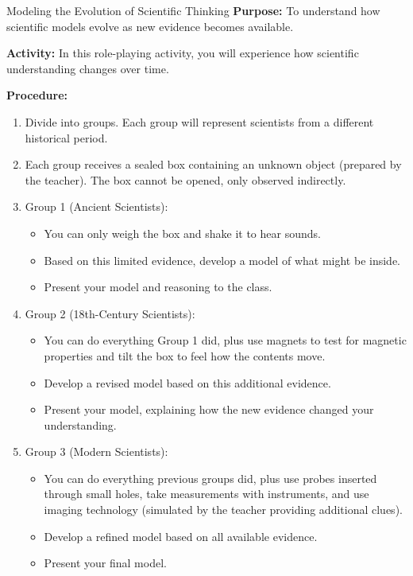 \begin{investigation}{Modeling the Evolution of Scientific Thinking}
\textbf{Purpose:} To understand how scientific models evolve as new evidence becomes available.

\textbf{Activity:} In this role-playing activity, you will experience how scientific understanding changes over time.

\textbf{Procedure:}
\begin{enumerate}
    \item Divide into groups. Each group will represent scientists from a different historical period.
    
    \item Each group receives a sealed box containing an unknown object (prepared by the teacher). The box cannot be opened, only observed indirectly.
    
    \item Group 1 (Ancient Scientists):
    \begin{itemize}
        \item You can only weigh the box and shake it to hear sounds.
        \item Based on this limited evidence, develop a model of what might be inside.
        \item Present your model and reasoning to the class.
    \end{itemize}
    
    \item Group 2 (18th-Century Scientists):
    \begin{itemize}
        \item You can do everything Group 1 did, plus use magnets to test for magnetic properties and tilt the box to feel how the contents move.
        \item Develop a revised model based on this additional evidence.
        \item Present your model, explaining how the new evidence changed your understanding.
    \end{itemize}
    
    \item Group 3 (Modern Scientists):
    \begin{itemize}
        \item You can do everything previous groups did, plus use probes inserted through small holes, take measurements with instruments, and use imaging technology (simulated by the teacher providing additional clues).
        \item Develop a refined model based on all available evidence.
        \item Present your final model.
    \end{itemize}
    

\end{enumerate}
\end{investigation}
